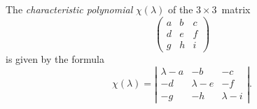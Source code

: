 

The \emph{characteristic polynomial} $\chi(\lambda)$ of the
$3 \times 3$~matrix
\[ \left( \begin{array}{ccc}
a & b & c \\
d & e & f \\
g & h & i \end{array} \right)\]
is given by the formula
\[ \chi(\lambda) = \left| \begin{array}{ccc}
\lambda - a & -b & -c \\
-d & \lambda - e & -f \\
-g & -h & \lambda - i \end{array} \right|.\]





